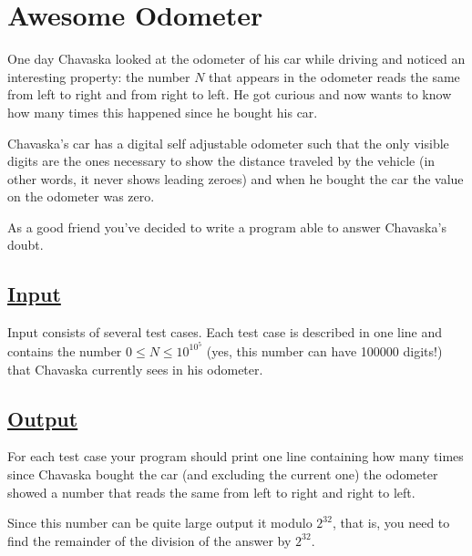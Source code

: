 \documentclass[12pt]{article}
\begin{document}
\pagestyle{empty}

\section*{Awesome Odometer}
One day Chavaska looked at the odometer of his car while driving and noticed an interesting property: the number $N$ that appears in the odometer reads the same from left to right and from right to left. He got curious and now wants to know how many times this happened since he bought his car.

Chavaska's car has a digital self adjustable odometer such that the only visible digits are the ones necessary  to show the distance traveled by the vehicle (in other words, it never shows leading zeroes) and when he bought the car the value on the odometer was zero.

As a good friend you've decided to write a program able to answer Chavaska's doubt.

\subsection*{\underline{Input}}
Input consists of several test cases. Each test case is described in one line and contains the number $0 \leq N \leq 10^{10^5}$ (yes, this number can have 100000 digits!) that Chavaska currently sees in his odometer.

\subsection*{\underline{Output}}
For each test case your program should print one line containing how many times since Chavaska bought the car (and excluding the current one) the odometer showed a number that reads the same from left to right and right to left.

Since this number can be quite large output it modulo $2^{32}$, that is, you need to find the remainder of the division of the answer by $2^{32}$.
\end{document}
